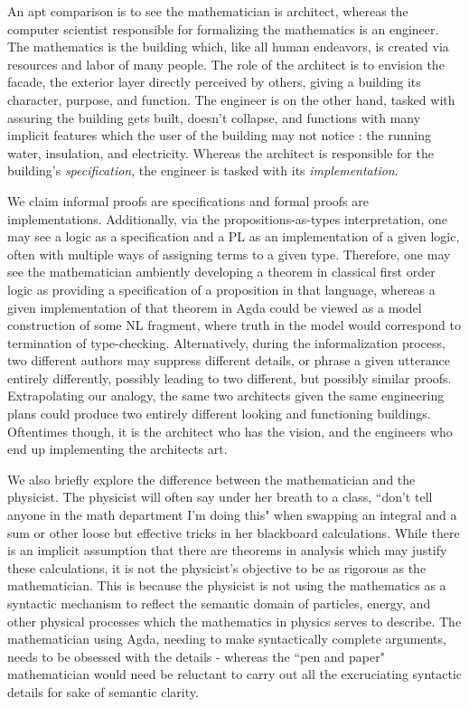 An apt comparison is to see the mathematician is architect, whereas the computer
scientist responsible for formalizing the mathematics is an engineer. The
mathematics is the building which, like all human endeavors, is created via
resources and labor of many people. The role of the architect is to envision the
facade, the exterior layer directly perceived by others, giving a building its
character, purpose, and function. The engineer is on the other hand, tasked with
assuring the building gets built, doesn't collapse, and functions with many
implicit features which the user of the building may not notice : the running
water, insulation, and electricity. Whereas the architect is responsible for the
building's \emph{specification}, the engineer is tasked with its
\emph{implementation}.

We claim informal proofs are specifications and formal proofs are
implementations. Additionally, via the propositions-as-types interpretation, one
may see a logic as a specification and a PL as an implementation of a given
logic, often with multiple ways of assigning terms to a given type. Therefore,
one may see the mathematician ambiently developing a theorem in classical first
order logic as providing a specification of a proposition in that language,
whereas a given implementation of that theorem in Agda could be viewed as a
model construction of some NL fragment, where truth in the model would
correspond to termination of type-checking. Alternatively, during the
informalization process, two different authors may suppress different details,
or phrase a given utterance entirely differently, possibly leading to two
different, but possibly similar proofs. Extrapolating our analogy, the same two
architects given the same engineering plans could produce two entirely different
looking and functioning buildings. Oftentimes though, it is the architect who
has the vision, and the engineers who end up implementing the architects art.

We also briefly explore the difference between the mathematician and the
physicist. The physicist will often say under her breath to a class,
``don't tell anyone in the math department I'm doing this" when swapping an
integral and a sum or other loose but effective tricks in her blackboard
calculations. While there is an implicit assumption that there are theorems in
analysis which may justify these calculations, it is not the physicist's objective
to be as rigorous as the mathematician. This is because the physicist is not
using the mathematics as a syntactic mechanism to reflect the semantic domain of
particles, energy, and other physical processes which the mathematics in physics
serves to describe. The mathematician using Agda, needing to make syntactically
complete arguments, needs to be obsessed with the details - whereas the
``pen and paper" mathematician would need be reluctant to carry out all the
excruciating syntactic details for sake of semantic clarity.


